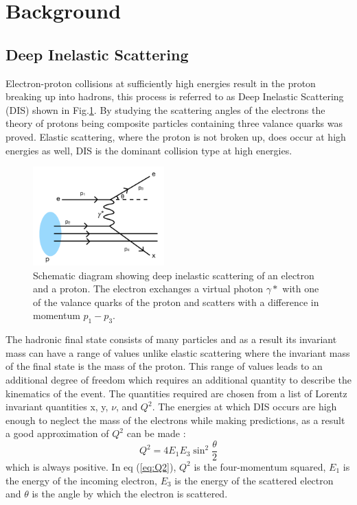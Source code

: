 \documentclass[journal, a4paper,11pt]{IEEEtran}
\begin{document}
\section{Background}

\subsection*{\textbf{Deep Inelastic Scattering}}

Electron-proton collisions at sufficiently high energies result in the proton breaking up into hadrons, this process is referred to as Deep Inelastic Scattering (DIS) shown in Fig.\ref{fig:DIS}. By studying the scattering angles of the electrons the theory of protons being composite particles containing three valance quarks was proved. Elastic scattering, where the proton is not broken up, does occur at high energies as well, DIS is the dominant collision type at high energies.

\begin{figure}[!h]
	\centering
		\includegraphics[width =0.45\textwidth]{DIS.png}
		\caption{Schematic diagram showing deep inelastic scattering of an electron and a proton. The electron exchanges a virtual photon $\gamma *$ with one of the valance quarks of the proton and scatters with a difference in momentum $p_1 - p_3$.}
		\label{fig:DIS}
\end{figure}

The hadronic final state consists of many particles and as a result its invariant mass can have a range of values unlike elastic scattering where the invariant mass of the final state is the mass of the proton. This range of values leads to an additional degree of freedom which requires an additional quantity to describe the kinematics of the event. The quantities required are chosen from a list of Lorentz invariant quantities x, y, $\nu$, and $Q^2$. 
The energies at which DIS occurs are high enough to neglect the mass of the electrons while making predictions, as a result a good approximation of $Q^2$ can be made \cite{Modern}:
\begin{equation}
	Q^2 = 4E_1E_3 \sin ^2\frac{\theta}{2}
	\label{eq:Q2}
\end{equation}
which is always positive. In eq (\ref{eq:Q2}), $Q^2$ is the four-momentum squared, $E_1$ is the energy of the incoming electron, $E_3$ is the energy of the scattered electron and $\theta$ is the angle by which the electron is scattered.
\end{document}
